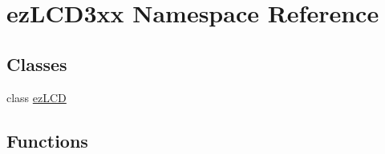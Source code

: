 \hypertarget{namespaceez_l_c_d3xx}{\section{ez\-L\-C\-D3xx Namespace Reference}
\label{df/d76/namespaceez_l_c_d3xx}
}
\subsection*{Classes}
\begin{DoxyCompactItemize}
\item 
class \hyperlink{classez_l_c_d3xx_1_1ez_l_c_d}{ez\-L\-C\-D}
\end{DoxyCompactItemize}
\subsection*{Functions}
